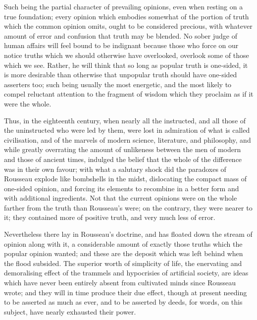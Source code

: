 Such being the partial character of prevailing opinions, even when resting on a true foundation; every opinion which embodies somewhat of the portion of truth which the common opinion omits, ought to be considered precious, with whatever amount of error and confusion that truth may be blended. No sober judge of human affairs will feel bound to be indignant because those who force on our notice truths which we should otherwise have overlooked, overlook some of those which we see. Rather, he will think that so long as popular truth is one-sided, it is more desirable than otherwise that unpopular truth should have one-sided asserters too; such being usually the most energetic, and the most likely to compel reluctant attention to the fragment of wisdom which they proclaim as if it were the whole.\par

Thus, in the eighteenth century, when nearly all the instructed, and all those of the uninstructed who were led by them, were lost in admiration of what is called civilisation, and of the marvels of modern science, literature, and philosophy, and while greatly overrating the amount of unlikeness between the men of modern and those of ancient times, indulged the belief that the whole of the difference was in their own favour; with what a salutary shock did the paradoxes of Rousseau explode like bombshells in the midst, dislocating the compact mass of one-sided opinion, and forcing its elements to recombine in a better form and with additional ingredients. Not that the current opinions were on the whole farther from the truth than Rousseau’s were; on the contrary, they were nearer to it; they contained more of positive truth, and very much less of error.\par

Nevertheless there lay in Rousseau’s doctrine, and has floated down the stream of opinion along with it, a considerable amount of exactly those truths which the popular opinion wanted; and these are the deposit which was left behind when the flood subsided. The superior worth of simplicity of life, the enervating and demoralising effect of the trammels and hypocrisies of artificial society, are ideas which have never been entirely absent from cultivated minds since Rousseau wrote; and they will in time produce their due effect, though at present needing to be asserted as much as ever, and to be asserted by deeds, for words, on this subject, have nearly exhausted their power.\par

